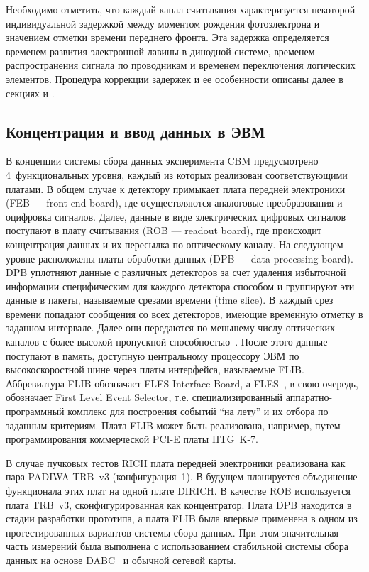Необходимо отметить, что каждый канал считывания характеризуется некоторой индивидуальной задержкой между моментом рождения фотоэлектрона и значением отметки времени переднего фронта. Эта задержка определяется временем развития электронной лавины в динодной системе, временем распространения сигнала по проводникам и временем переключения логических элементов. Процедура коррекции задержек и ее особенности описаны далее в секциях \cite{} и \cite{}.

\subsection{Концентрация и ввод данных в ЭВМ} \label{section:secFinalReadout}

В концепции системы сбора данных эксперимента CBM предусмотрено 4~функциональных уровня, каждый из которых реализован соответствующими платами.
В общем случае к детектору примыкает плата передней электроники (FEB --- front-end board), где осуществляются аналоговые преобразования и оцифровка сигналов. Далее, данные в виде электрических цифровых сигналов поступают в плату считывания (ROB --- readout board), где происходит концентрация данных и их пересылка по оптическому каналу. На следующем уровне расположены платы обработки данных (DPB --- data processing board).
DPB уплотняют данные с различных детекторов за счет удаления избыточной информации специфическим для каждого детектора способом и группируют эти данные в пакеты, называемые срезами времени (time slice). В каждый срез времени попадают сообщения со всех детекторов, имеющие временную отметку в заданном интервале. Далее они передаются по меньшему числу оптических каналов с более высокой пропускной способностью~\cite{DPB}. После этого данные поступают в память, доступную центральному процессору ЭВМ по высокоскоростной шине через платы интерфейса, называемые FLIB. Аббревиатура FLIB обозначает FLES Interface Board, а FLES~\cite{FLES}, в свою очередь, обозначает First Level Event Selector, т.е. специализированный аппаратно-программный комплекс для построения событий ``на лету'' и их отбора по заданным критериям. Плата FLIB может быть реализована, например, путем программирования коммерческой PCI-E платы HTG~K-7.

В случае пучковых тестов RICH плата передней электроники реализована как пара PADIWA-TRB~v3 (конфигурация~1). В будущем планируется объединение функционала этих плат на одной плате DIRICH. В качестве ROB используется плата TRB~v3, сконфигурированная как концентратор. Плата DPB находится в стадии разработки прототипа, а плата FLIB была впервые применена в одном из протестированных вариантов системы сбора данных. При этом значительная часть измерений была выполнена с использованием стабильной системы сбора данных на основе DABC~\cite{DABC} и обычной сетевой карты.
